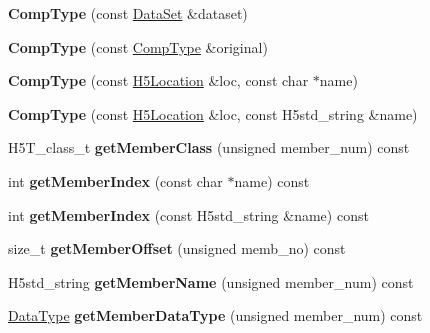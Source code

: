 \begin{DoxyCompactItemize}
{\bfseries Comp\+Type} (const \hyperlink{class_h5_1_1_data_set}{Data\+Set} \&dataset)
\item 
\mbox{\label{class_h5_1_1_comp_type_a66842ec0c02ec8f674338d1abc89cf9c}} 
{\bfseries Comp\+Type} (const \hyperlink{class_h5_1_1_comp_type}{Comp\+Type} \&original)
\item 
\mbox{\label{class_h5_1_1_comp_type_a32f6f9d920546a64109c3563c9dec9fb}} 
{\bfseries Comp\+Type} (const \hyperlink{class_h5_1_1_h5_location}{H5\+Location} \&loc, const char $\ast$name)
\item 
\mbox{\label{class_h5_1_1_comp_type_a2cf6cb464bab71ac71696f22d5381e1d}} 
{\bfseries Comp\+Type} (const \hyperlink{class_h5_1_1_h5_location}{H5\+Location} \&loc, const H5std\+\_\+string \&name)
\item 
\mbox{\label{class_h5_1_1_comp_type_a8cd73bdec474d9f1018fa09e91258aeb}} 
H5\+T\+\_\+class\+\_\+t {\bfseries get\+Member\+Class} (unsigned member\+\_\+num) const
\item 
\mbox{\label{class_h5_1_1_comp_type_a5b7e8b7c9c0f5f99b07fe7764af4a450}} 
int {\bfseries get\+Member\+Index} (const char $\ast$name) const
\item 
\mbox{\label{class_h5_1_1_comp_type_ac7469e9774b9295b702ace113d4763de}} 
int {\bfseries get\+Member\+Index} (const H5std\+\_\+string \&name) const
\item 
\mbox{\label{class_h5_1_1_comp_type_a5c5f63a87ba09215616b0a3e5202d935}} 
size\+\_\+t {\bfseries get\+Member\+Offset} (unsigned memb\+\_\+no) const
\item 
\mbox{\label{class_h5_1_1_comp_type_a8148f2cd2b761f711b1a4ef1dc3b5f1f}} 
H5std\+\_\+string {\bfseries get\+Member\+Name} (unsigned member\+\_\+num) const
\item 
\mbox{\label{class_h5_1_1_comp_type_afa38359a984ee4246f53fa42f214fd67}} 
\hyperlink{class_h5_1_1_data_type}{Data\+Type} {\bfseries get\+Member\+Data\+Type} (unsigned member\+\_\+num) const

\end{DoxyCompactItemize}
